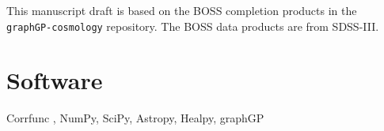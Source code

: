 \documentclass[apj]{emulateapj}
\providecommand{\software}[1]{\section*{Software}#1}
\begin{document}
\acknowledgments
This manuscript draft is based on the BOSS completion products in the
\texttt{graphGP-cosmology} repository.  The BOSS data products are from SDSS-III.

\software{Corrfunc \citep{Corrfunc2020}, NumPy, SciPy, Astropy, Healpy,
graphGP}



\end{document}
